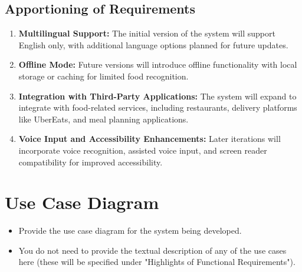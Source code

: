 \documentclass[]{article}
\begin{document}

\subsection{Apportioning of Requirements}
\label{sub:apportioning_of_requirements}
\begin{enumerate}
    \item \textbf{Multilingual Support: } The initial version of the system will support English only, with additional language options planned for future updates.
    \item \textbf{Offline Mode: } Future versions will introduce offline functionality with local storage or caching for limited food recognition.
    \item \textbf{Integration with Third-Party Applications: } The system will expand to integrate with food-related services, including restaurants, delivery platforms like UberEats, and meal planning applications.
    \item \textbf{Voice Input and Accessibility Enhancements: } Later iterations will incorporate voice recognition, assisted voice input, and screen reader compatibility for improved accessibility.
\end{enumerate}

\section{Use Case Diagram}
\label{sec:use_case_diagram}
\begin{itemize}
	\item Provide the use case diagram for the system being developed.
	\item You do not need to provide the textual description of any of the use cases here (these will be specified under "Highlights of Functional Requirements").
\end{itemize}
\end{document}
